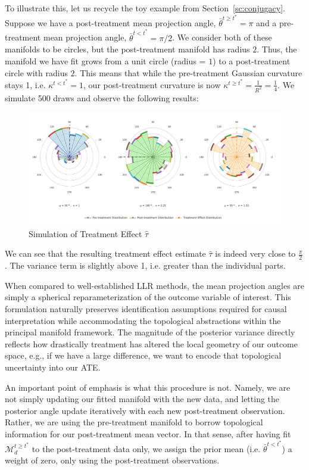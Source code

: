 \documentclass[twoside,11pt]{article}
\begin{document}
To illustrate this, let us recycle the toy example from Section~\ref{sc:conjugacy}. Suppose we have a post-treatment mean projection angle, $\bar{\theta}^{t \geq t^*} = \pi$ and a pre-treatment mean projection angle, $\bar{\theta}^{t < t^*} = \pi/2$. We consider both of these manifolds to be circles, but the post-treatment manifold has radius $2$. Thus, the manifold we have fit grows from a unit circle (radius = $1$) to a post-treatment circle with radius $2$. This means that while the pre-treatment Gaussian curvature stays 1, i.e. $\kappa^{t < t^*} = 1$, our post-treatment curvature is now $\kappa^{t \geq t^*} = \frac{1}{R^2} = \frac{1}{4}$. We simulate 500 draws and observe the following results: 

\begin{figure}[h!]
  \begin{center}
    \includegraphics[width=1\textwidth]{../fig/rd-sim.png}
  \end{center}
  \caption{Simulation of Treatment Effect $\hat{\tau}$}\label{fig:rd-sim}
\end{figure}


We can see that the resulting treatment effect estimate $\hat{\tau}$ is indeed very close to $\frac{\pi}{2}$. The variance term is slightly above 1, i.e. greater than the individual parts.  

When compared to well-established LLR methods, the mean projection angles are simply a spherical reparameterization of the outcome variable of interest. This formulation naturally preserves identification assumptions required for causal interpretation while accommodating the topological abstractions within the principal manifold framework. The magnitude of the posterior variance directly reflects how drastically treatment has altered the local geometry of our outcome space, e.g., if we have a large difference, we want to encode that topological uncertainty into our ATE. 

An important point of emphasis is what this procedure is not. Namely, we are not simply updating our fitted manifold with the new data, and letting the posterior angle update iteratively with each new post-treatment observation. Rather, we are using the pre-treatment manifold to borrow topological information for our post-treatment mean vector. In that sense, after having fit $\mathcal{M}_d^{t \geq t^*}$ to the post-treatment data only, we assign the prior mean (i.e. $\bar{\theta}^{t<t^*}$) a weight of zero, only using the post-treatment observations.
\end{document}
